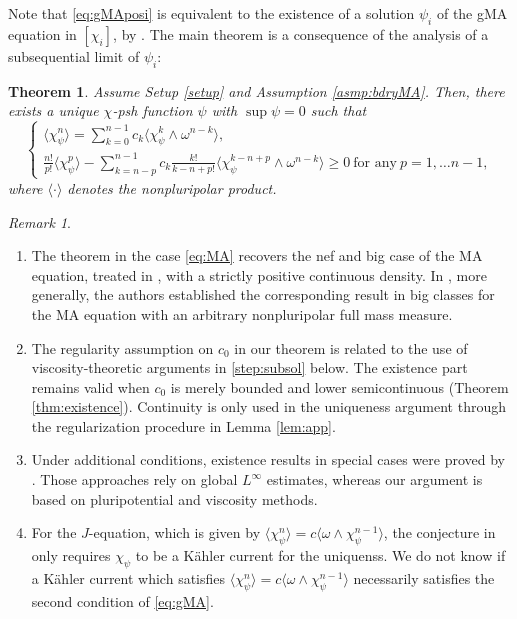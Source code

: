 \documentclass{amsart}
\numberwithin{equation}{section}
\theoremstyle{plain}
\newtheorem{thm}[equation]{Theorem}
\theoremstyle{definition}
\theoremstyle{remark}
\newtheorem{remark}[equation]{Remark}
\begin{document}
Note that \eqref{eq:gMAposi} is equivalent to the existence of a solution $\psi_i$ of the gMA equation in $[\chi_i]$, by \cite{Datar-Pingali,FM}. The main theorem is a consequence of the analysis of a subsequential limit of $\psi_i$:

\begin{thm}\label{thm:main}
    Assume Setup \ref{setup} and Assumption \ref{asmp:bdryMA}.
    Then, there exists a unique $\chi$-psh function $\psi$ with $\sup \psi=0$ such that
    \begin{equation}\label{eq:gMA}
    \begin{cases}
        \langle\chi_\psi^n\rangle=\sum_{k=0}^{n-1}c_k\langle\chi_\psi^k\wedge\omega^{n-k}\rangle,
        \\
        \frac{n!}{p!}\langle\chi_\psi^p\rangle-\sum_{k=n-p}^{n-1}c_k\frac{k!}{k-n+p!}\langle\chi_\psi^{k-n+p}\wedge\omega^{n-k}\rangle\ge0 \ \text{for any} \ p=1,\dots n-1, 
    \end{cases}
    \end{equation}
    where $\langle\cdot\rangle$ denotes the nonpluripolar product. 
\end{thm}

\begin{remark}\label{rem:main}
    \begin{enumerate}[label={\upshape(\roman*)}]
        \item The theorem in the case \eqref{eq:MA} recovers the nef and big case of the MA equation, treated in \cite{BEGZ}, with a strictly positive continuous density. 
        In \cite{BEGZ}, more generally, the authors established the corresponding result in big classes for the MA equation with an arbitrary nonpluripolar full mass measure. 
        \item The regularity assumption on $c_0$ in our theorem is related to the use of viscosity-theoretic arguments in \ref{step:subsol} below. 
        The existence part remains valid when $c_0$ is merely bounded and lower semicontinuous (Theorem \ref{thm:existence}). Continuity is only used in the uniqueness argument through the regularization procedure in Lemma \ref{lem:app}.
        \item Under additional conditions, existence results in special cases were proved by \cite{FL,DMS,Sun23,To,GS}. Those approaches rely on global $L^\infty$ estimates, whereas our argument is based on pluripotential and viscosity methods.
        \item\label{item:DMS} For the $J$-equation, which is given by $\langle
        \chi_\psi^n\rangle=c\langle\omega\wedge\chi_\psi^{n-1}\rangle$, the conjecture in \cite[Conjecture 1.2]{DMS} only requires $\chi_\psi$ to be a Kähler current for the uniquenss.
        We do not know if a Kähler current which satisfies $\langle
        \chi_\psi^n\rangle=c\langle\omega\wedge\chi_\psi^{n-1}\rangle$ necessarily satisfies the second condition of \eqref{eq:gMA}.
    \end{enumerate}
\end{remark}
\end{document}
